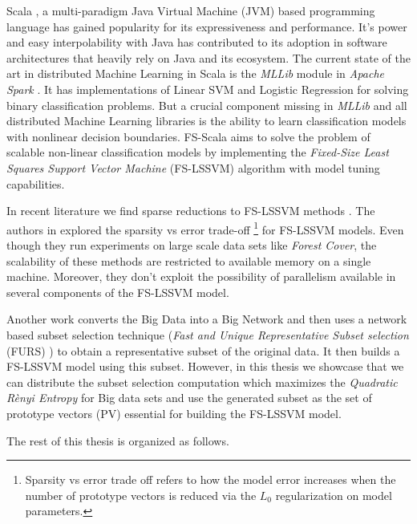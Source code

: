 Scala \cite{scala-overview-tech-report}, a multi-paradigm Java Virtual Machine (JVM) based programming language has gained popularity for its expressiveness and performance. It's power and easy interpolability with Java has contributed to its adoption in software architectures that heavily rely on Java and its ecosystem. The current state of the art in distributed Machine Learning in Scala is the \textit{MLLib} module in \textit{Apache Spark} \cite{Meng}. It has implementations of Linear SVM and Logistic Regression for solving binary classification problems. But a crucial component missing in \textit{MLLib} and all distributed Machine Learning libraries is the ability to learn classification models with nonlinear decision boundaries. FS-Scala aims to solve the problem of scalable non-linear classification models by implementing the \textit{Fixed-Size Least Squares Support Vector Machine} (FS-LSSVM) algorithm \cite{DeBrabanter2010,Suykens2002} with model tuning capabilities.

In recent literature we find sparse reductions to FS-LSSVM methods \cite{Mall2015,Mall2013}. The authors in \cite{Mall2015,Mall2013} explored the sparsity vs error trade-off \footnote{Sparsity vs error trade off refers to how the model error increases when the number of prototype vectors is reduced via the $L_0$ regularization on model parameters.} for FS-LSSVM models. Even though they run experiments on large scale data sets like \emph{Forest Cover}, the scalability of these methods are restricted to available memory on a single machine. Moreover, they don't exploit the possibility of parallelism available in several components of the FS-LSSVM model. 

Another work \cite{Mall2014} converts the Big Data into a Big Network and then uses a network based subset selection technique (\textit{Fast and Unique Representative Subset selection} (FURS) \cite{Mall2013FURS}) to obtain a representative subset of the original data. It then builds a FS-LSSVM model using this subset. However, in this thesis we showcase that we can distribute the subset selection computation which maximizes the \textit{Quadratic R\`enyi Entropy} for Big data sets and use the generated subset as the set of prototype vectors (PV) essential for building the FS-LSSVM model.

The rest of this thesis is organized as follows.

